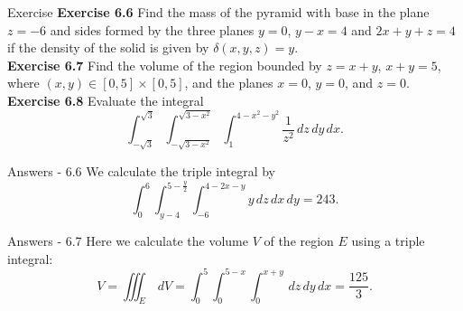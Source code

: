 \documentclass[aspectratio=169, UTF8]{beamer}
\begin{document}


\begin{frame}{Exercise}
    \textbf{Exercise 6.6} Find the mass of the pyramid with base in the plane $z = -6$ and sides
formed by the three planes $y = 0$, $y - x = 4$ and $2x + y + z = 4$
if the density of the solid is given by $\delta(x, y, z) = y$. \\
    \textbf{Exercise 6.7} Find the volume of the region bounded by $z = x + y$, $x + y = 5$,
where $(x, y) \in [0, 5] \times [0, 5]$, and the planes $x = 0$, $y = 0$, and $z = 0$. \\

    \textbf{Exercise 6.8} Evaluate the integral
\[
\int_{-\sqrt{3}}^{\sqrt{3}} \int_{-\sqrt{3-x^2}}^{\sqrt{3-x^2}} \int_{1}^{4-x^2-y^2} \frac{1}{z^2} \, dz \, dy \, dx.
\] 
\end{frame}
\begin{frame}{Answers - 6.6}
    We calculate the triple integral by
\[
\int_{0}^{6} \int_{y-4}^{5-\frac{y}{2}} \int_{-6}^{4-2x-y} y \, dz \, dx \, dy = 243.
\]
\end{frame}
\begin{frame}{Answers - 6.7}
    Here we calculate the volume $V$ of the region $E$ using a triple integral:
\[
V = \iiint_E \, dV = \int_0^5 \int_0^{5-x} \int_0^{x+y} \, dz \, dy \, dx = \frac{125}{3}.
\]

\end{frame}
\end{document}
